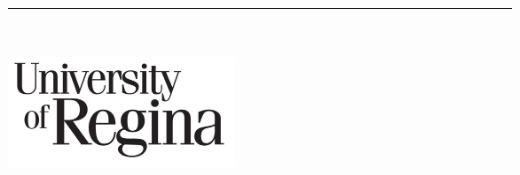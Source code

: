 %
\begin{titlepage}
	\flushright
	\hfill
	\vfill
	{\LARGE\thesisTitle} \par
	\rule[5pt]{\textwidth}{.4pt} \par
	{\Large\thesisName}
	\vfill
	\textit{\large\thesisDate} \\
\end{titlepage}


\begin{titlepage}
	\tgherosfont
	\centering
	
	\includegraphics[width=6cm]{img/logo_uofr_black} \\[2mm]
	\textsf{\thesisUniversityDepartment} \\
	
	\vfill
	{\LARGE \color{ctcolormain}\textbf{\thesisTitle} \\[10mm]}
	{\Large \thesisName} \\
	

\end{titlepage}
